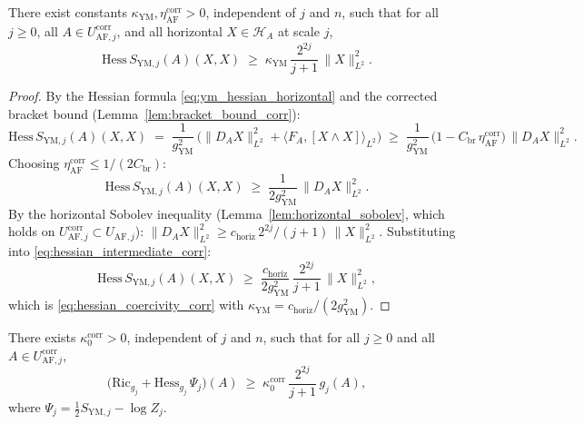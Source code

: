 \begin{theorem}
\label{thm:hessian_coercivity_corr}
There exist constants $\kappa_{\mathrm{YM}},\eta_{\mathrm{AF}}^{
\mathrm{corr}}>0$, independent of $j$ and $n$, such that for all
$j\ge 0$, all $A\in U_{\mathrm{AF},j}^{\mathrm{corr}}$, and all
horizontal $X\in\mathcal{H}_{A}$ at scale $j$,
\begin{equation}
\label{eq:hessian_coercivity_corr}
  \mathrm{Hess}\,S_{\mathrm{YM},j}(A)(X,X)
  \;\ge\;\kappa_{\mathrm{YM}}\,\frac{2^{2j}}{j+1}\,
  \|X\|_{L^{2}}^{2}.
\end{equation}
\end{theorem}

\begin{proof}
By the Hessian formula \eqref{eq:ym_hessian_horizontal} and the
corrected bracket bound (Lemma~\ref{lem:bracket_bound_corr}):
\begin{equation*}
  \mathrm{Hess}\,S_{\mathrm{YM},j}(A)(X,X)
  \;=\;\frac{1}{g_{\mathrm{YM}}^{2}}\,
  \bigl(\|D_{A}X\|_{L^{2}}^{2}
  +\langle F_{A},[X\wedge X]\rangle_{L^{2}}\bigr)
  \;\ge\;\frac{1}{g_{\mathrm{YM}}^{2}}\,
  \bigl(1-C_{\mathrm{br}}\,\eta_{\mathrm{AF}}^{\mathrm{corr}}\bigr)\,
  \|D_{A}X\|_{L^{2}}^{2}.
\end{equation*}
Choosing $\eta_{\mathrm{AF}}^{\mathrm{corr}}\le 1/(2C_{\mathrm{br}})$:
\begin{equation}
\label{eq:hessian_intermediate_corr}
  \mathrm{Hess}\,S_{\mathrm{YM},j}(A)(X,X)
  \;\ge\;\frac{1}{2g_{\mathrm{YM}}^{2}}\,\|D_{A}X\|_{L^{2}}^{2}.
\end{equation}
By the horizontal Sobolev inequality
(Lemma~\ref{lem:horizontal_sobolev}, which holds on
$U_{\mathrm{AF},j}^{\mathrm{corr}}\subset U_{\mathrm{AF},j}$):
$\|D_{A}X\|_{L^{2}}^{2}\ge c_{\mathrm{horiz}}\,2^{2j}/(j+1)\,
\|X\|_{L^{2}}^{2}$. Substituting into
\eqref{eq:hessian_intermediate_corr}:
\begin{equation*}
  \mathrm{Hess}\,S_{\mathrm{YM},j}(A)(X,X)
  \;\ge\;\frac{c_{\mathrm{horiz}}}{2g_{\mathrm{YM}}^{2}}\,
  \frac{2^{2j}}{j+1}\,\|X\|_{L^{2}}^{2},
\end{equation*}
which is \eqref{eq:hessian_coercivity_corr} with
$\kappa_{\mathrm{YM}}=c_{\mathrm{horiz}}/(2g_{\mathrm{YM}}^{2})$.
\end{proof}

\begin{theorem}
\label{thm:be_curvature_corr}
There exists $\kappa_{0}^{\mathrm{corr}}>0$, independent of $j$
and $n$, such that for all $j\ge 0$ and all
$A\in U_{\mathrm{AF},j}^{\mathrm{corr}}$,
\begin{equation}
\label{eq:be_curvature_corr}
  \bigl(\mathrm{Ric}_{g_{j}}+\mathrm{Hess}_{g_{j}}\,\Psi_{j}
  \bigr)(A)
  \;\ge\;\kappa_{0}^{\mathrm{corr}}\,\frac{2^{2j}}{j+1}\,g_{j}(A),
\end{equation}
where $\Psi_{j}=\tfrac{1}{2}S_{\mathrm{YM},j}-\log Z_{j}$.
\end{theorem}

